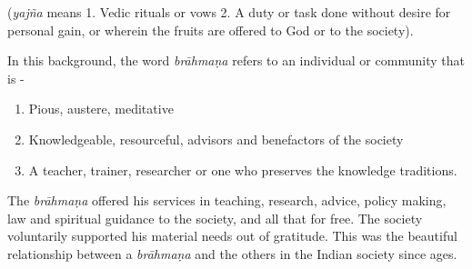 (\textit{yajña} means 1. Vedic rituals or vows 2. A duty or task done without desire for personal gain, or wherein the fruits are offered to God or to the society).

In this background, the word \textit{brāhmaṇa} refers to an individual or community that is -

\vspace{-.3cm}

\begin{enumerate}
\itemsep=0pt

 \item Pious, austere, meditative 

 \item Knowledgeable, resourceful, advisors and benefactors of the society 

 \item A teacher, trainer, researcher or one who preserves the knowledge traditions.

\end{enumerate}

\vspace{-.3cm}

The \textit{brāhmaṇa} offered his services in teaching, research, advice, policy making, law and spiritual guidance to the society, and all that for free. The society voluntarily supported his material needs out of gratitude. This was the beautiful relationship between a \textit{brāhmaṇa} and the others in the Indian society since ages.

